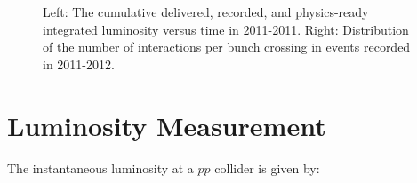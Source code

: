 \begin{figure}[htbp]
	\centering
	\hfill
	\caption{Left: The cumulative delivered, recorded, and physics-ready integrated luminosity versus time in 2011-2011. Right: Distribution of the number of interactions per bunch crossing in events recorded in 2011-2012.}
	
\end{figure}

\section{Luminosity Measurement}\label{sec:luminosity-measurement}
The instantaneous luminosity at a $pp$ collider is given by:

